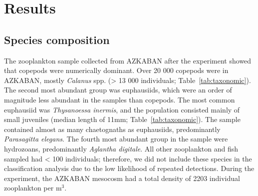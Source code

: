 \section{Results}
\subsection{Species composition}
The zooplankton sample collected from AZKABAN after the experiment showed that copepods were numerically dominant. Over 20 000 copepods were in AZKABAN, mostly \textit{Calanus} spp. (> 13 000 individuals; Table~\ref{tab:taxonomic}). The second most abundant group was euphausiids, which were an order of magnitude less abundant in the samples than copepods. The most common euphausiid was \textit{Thysanoessa inermis}, and the population consisted mainly of small juveniles (median length of 11mm; Table~\ref{tab:taxonomic}). The sample contained almost as many chaetognaths as euphausiids, predominantly \textit{Parasagitta elegans}. The fourth most abundant group in the sample were hydrozoans, predominantly \textit{Aglantha digitale}. All other zooplankton and fish sampled had < 100 individuals; therefore, we did not include these species in the classification analysis due to the low likelihood of repeated detections. During the experiment, the AZKABAN mesocosm had a total density of 2203 individual zooplankton per m$^3$.

